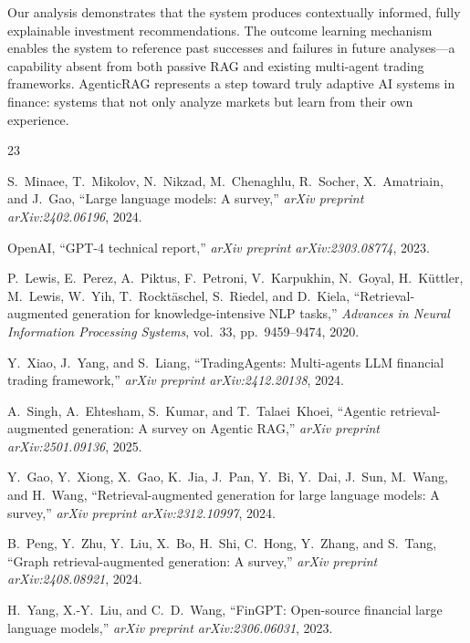 \documentclass[conference]{IEEEtran}
\begin{document}
Our analysis demonstrates that the system produces contextually informed, fully explainable investment recommendations. The outcome learning mechanism enables the system to reference past successes and failures in future analyses---a capability absent from both passive RAG and existing multi-agent trading frameworks. AgenticRAG represents a step toward truly adaptive AI systems in finance: systems that not only analyze markets but learn from their own experience.


\begin{thebibliography}{23}

S.~Minaee, T.~Mikolov, N.~Nikzad, M.~Chenaghlu, R.~Socher, X.~Amatriain, and J.~Gao, ``Large language models: A survey,'' \textit{arXiv preprint arXiv:2402.06196}, 2024.

OpenAI, ``GPT-4 technical report,'' \textit{arXiv preprint arXiv:2303.08774}, 2023.

P.~Lewis, E.~Perez, A.~Piktus, F.~Petroni, V.~Karpukhin, N.~Goyal, H.~K{\"u}ttler, M.~Lewis, W.~Yih, T.~Rockt{\"a}schel, S.~Riedel, and D.~Kiela, ``Retrieval-augmented generation for knowledge-intensive NLP tasks,'' \textit{Advances in Neural Information Processing Systems}, vol.~33, pp.~9459--9474, 2020.

Y.~Xiao, J.~Yang, and S.~Liang, ``TradingAgents: Multi-agents LLM financial trading framework,'' \textit{arXiv preprint arXiv:2412.20138}, 2024.

A.~Singh, A.~Ehtesham, S.~Kumar, and T.~Talaei~Khoei, ``Agentic retrieval-augmented generation: A survey on Agentic RAG,'' \textit{arXiv preprint arXiv:2501.09136}, 2025.

Y.~Gao, Y.~Xiong, X.~Gao, K.~Jia, J.~Pan, Y.~Bi, Y.~Dai, J.~Sun, M.~Wang, and H.~Wang, ``Retrieval-augmented generation for large language models: A survey,'' \textit{arXiv preprint arXiv:2312.10997}, 2024.

B.~Peng, Y.~Zhu, Y.~Liu, X.~Bo, H.~Shi, C.~Hong, Y.~Zhang, and S.~Tang, ``Graph retrieval-augmented generation: A survey,'' \textit{arXiv preprint arXiv:2408.08921}, 2024.

H.~Yang, X.-Y.~Liu, and C.~D.~Wang, ``FinGPT: Open-source financial large language models,'' \textit{arXiv preprint arXiv:2306.06031}, 2023.


\end{thebibliography}
\end{document}
